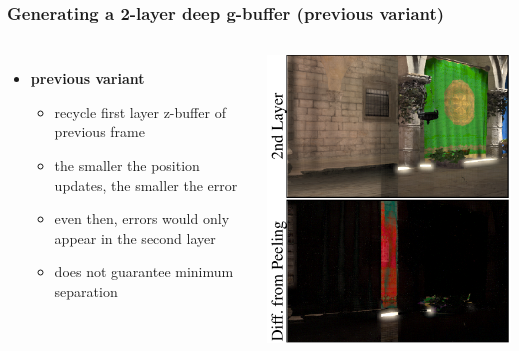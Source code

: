 \documentclass[aspectratio=169]{beamer}
\begin{document}
	\begin{frame}
		\frametitle{Generating a 2-layer deep g-buffer (previous variant)}
		\begin{columns}
				\begin{itemize}
					\item \textbf{previous variant}
						\begin{itemize}
							\item recycle first layer z-buffer of previous frame
							\item the smaller the position updates, the smaller the error
							\item even then, errors would only appear in the second layer 
							\item does not guarantee minimum separation
						\end{itemize}
				\end{itemize}
				\includegraphics[height=.9\textwidth]{img/previous.png}
		\end{columns}
	\end{frame}	
\end{document}
